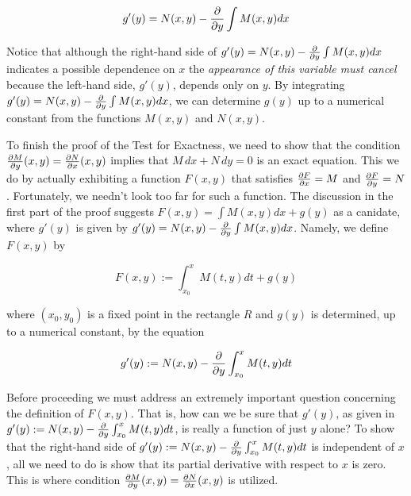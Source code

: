 $$g'(y)=N(x,y)-{\partial\over\partial y}\int M(x,y)dx$$

Notice that although the right-hand side of $g'(y)=N(x,y)-{\partial\over\partial y}\int M(x,y)dx$ indicates a possible dependence on $x$ the {\it appearance of this variable must cancel} because the left-hand side, $g'(y)$, depends only on $y$. By integrating $g'(y)=N(x,y)-{\partial\over\partial y}\int M(x,y)dx$, we can determine $g(y)$ up to a numerical constant from the functions $M(x,y)$ and $N(x,y)$.

\vskip 1mm
To finish the proof of the Test for Exactness, we need to show that the condition ${\partial M\over\partial y}(x,y)={\partial N\over\partial x}(x,y)$ implies that $M\,dx+N\,dy=0$ is an exact equation. This we do by actually exhibiting a function $F(x,y)$ that satisfies ${\partial F\over\partial x}=M$ and ${\partial F\over\partial y}=N$. Fortunately, we needn't look too far for such a function. The discussion in the first part of the proof suggests $F(x,y)=\int M(x,y)dx+g(y)$ as a canidate, where $g'(y)$ is given by $g'(y)=N(x,y)-{\partial\over\partial y}\int M(x,y)dx$. Namely, we define $F(x,y)$ by

$$F(x,y):=\int^{x}_{x_{0}}M(t,y)dt+g(y)$$

where $(x_0,y_0)$ is a fixed point in the rectangle $R$ and $g(y)$ is determined, up to a numerical constant, by the equation

$$g'(y):=N(x,y)-{\partial\over\partial y}\int^{x}_{x_{0}}M(t,y)dt$$

Before proceeding we must address an extremely important question concerning the definition of $F(x,y)$. That is, how can we be sure that $g'(y)$, as given in $g'(y):=N(x,y)-{\partial\over\partial y}\int^{x}_{x_{0}}M(t,y)dt$, is really a function of just $y$ alone? To show that the right-hand side of $g'(y):=N(x,y)-{\partial\over\partial y}\int^{x}_{x_{0}}M(t,y)dt$ is independent of $x$, all we need to do is show that its partial derivative with respect to $x$ is zero. This is where condition ${\partial M\over\partial y}(x,y)={\partial N\over\partial x}(x,y)$ is utilized. 

\vfill\eject
\bye
